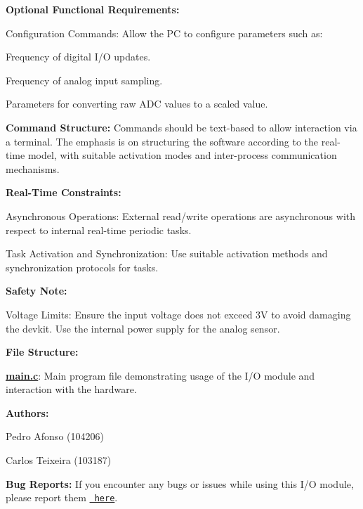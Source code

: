 {\bfseries{Optional Functional Requirements\+:}}
\begin{DoxyItemize}
\item Configuration Commands\+: Allow the PC to configure parameters such as\+:
\begin{DoxyItemize}
\item Frequency of digital I/O updates.
\item Frequency of analog input sampling.
\item Parameters for converting raw ADC values to a scaled value.
\end{DoxyItemize}
\end{DoxyItemize}

{\bfseries{Command Structure\+:}} Commands should be text-\/based to allow interaction via a terminal. The emphasis is on structuring the software according to the real-\/time model, with suitable activation modes and inter-\/process communication mechanisms.

{\bfseries{Real-\/\+Time Constraints\+:}}
\begin{DoxyItemize}
\item Asynchronous Operations\+: External read/write operations are asynchronous with respect to internal real-\/time periodic tasks.
\item Task Activation and Synchronization\+: Use suitable activation methods and synchronization protocols for tasks.
\end{DoxyItemize}

{\bfseries{Safety Note\+:}}
\begin{DoxyItemize}
\item Voltage Limits\+: Ensure the input voltage does not exceed 3V to avoid damaging the devkit. Use the internal power supply for the analog sensor.
\end{DoxyItemize}

{\bfseries{File Structure\+:}}
\begin{DoxyItemize}
\item {\bfseries{\mbox{\hyperlink{main_8c}{main.\+c}}}}\+: Main program file demonstrating usage of the I/O module and interaction with the hardware.
\end{DoxyItemize}

{\bfseries{Authors\+:}}
\begin{DoxyItemize}
\item Pedro Afonso (104206)
\item Carlos Teixeira (103187)
\end{DoxyItemize}

{\bfseries{Bug Reports\+:}} If you encounter any bugs or issues while using this I/O module, please report them \href{https://github.com/pisko19/SETR/issues}{\texttt{ here}}. 